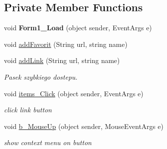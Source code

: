\subsection*{Private Member Functions}
\begin{DoxyCompactItemize}
\item 
\mbox{\label{class_windows_forms_app2_1_1_przegladarka_a7d52cb2619b2a3c247a6f420ee7a6ef4}} 
void {\bfseries Form1\+\_\+\+Load} (object sender, Event\+Args e)
\item 
void \hyperlink{class_windows_forms_app2_1_1_przegladarka_ae81e3a8848fdaaecd2f51a2f17e60540}{add\+Favorit} (String url, string name)
\item 
\mbox{\label{class_windows_forms_app2_1_1_przegladarka_a317944e036dffa9dbae17e072ffce939}} 
void \hyperlink{class_windows_forms_app2_1_1_przegladarka_a317944e036dffa9dbae17e072ffce939}{add\+Link} (String url, string name)
\begin{DoxyCompactList}\small\item\em Pasek szybkiego dostepu. \end{DoxyCompactList}\item 
\mbox{\label{class_windows_forms_app2_1_1_przegladarka_a09bd06ccc833afe04008333d58e873b1}} 
void \hyperlink{class_windows_forms_app2_1_1_przegladarka_a09bd06ccc833afe04008333d58e873b1}{items\+\_\+\+Click} (object sender, Event\+Args e)
\begin{DoxyCompactList}\small\item\em click link button \end{DoxyCompactList}\item 
\mbox{\label{class_windows_forms_app2_1_1_przegladarka_a263c2982999a825c5df27a3d0394f8a6}} 
void \hyperlink{class_windows_forms_app2_1_1_przegladarka_a263c2982999a825c5df27a3d0394f8a6}{b\+\_\+\+Mouse\+Up} (object sender, Mouse\+Event\+Args e)
\begin{DoxyCompactList}\small\item\em show context menu on button \end{DoxyCompactList}\item 
\mbox{\label{class_windows_forms_app2_1_1_przegladarka_a7ebc793c65547468c33de98bca06db2f}} 

\end{DoxyCompactItemize}
